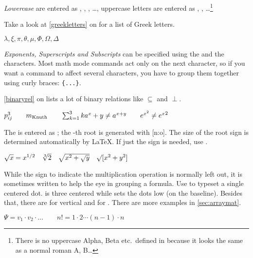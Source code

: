 \emph{Lowercase } are entered as ,
, , \ldots, uppercase letters
are entered as , , \ldots\footnote{There is no
  uppercase Alpha, Beta etc.\ defined in \LaTeXe{} because it looks the same as a
  normal roman A, B\ldots{}}

Take a look at \autoref{greekletters} on  for a
list of Greek letters.
\begin{example}
$\lambda,\xi,\pi,\theta,
 \mu,\Phi,\Omega,\Delta$
\end{example}

\emph{Exponents, Superscripts and Subscripts} can be specified using%
the \ai{\^} and the \ai{\_} characters.
Most math mode commands act only on the next character, so if you
want a command to affect several characters, you have to group them
together using curly braces: \verb|{...}|.

\autoref{binaryrel} on  lists a lot of binary
relations like $\subseteq$ and $\perp$.

\begin{example}
$p^3_{ij} \qquad 
 m_\text{Knuth}\qquad
\sum_{k=1}^3 k \\[5pt]
 a^x+y \neq a^{x+y}\qquad 
 e^{x^2} \neq {e^x}^2$
\end{example}

The \emph{} is entered as ; the
-th root is generated with [n:o]. The size of
the root sign is determined automatically by \LaTeX. If just the sign
is needed, use .

\begin{example}
$\sqrt{x} = x^{1/2}
 \quad \sqrt[3]{2}
 \quad \sqrt{x^{2} + \sqrt{y}}
 \quad \surd[x^2 + y^2]$
\end{example}

While the \emph{} sign to indicate%
the multiplication operation is normally left out, it is sometimes written
to help the eye in grouping a formula.
Use  to typeset a single centered dot.  is
three centered \emph{} while  sets the dots low (on the
baseline). Besides that, there are  for
vertical and  for . There are more examples in
\autoref{sec:arraymat}.
\begin{example}
$\Psi = v_1 \cdot v_2
 \cdot \ldots \qquad 
 n! = 1 \cdot 2 
 \cdots (n-1) \cdot n$
\end{example}

